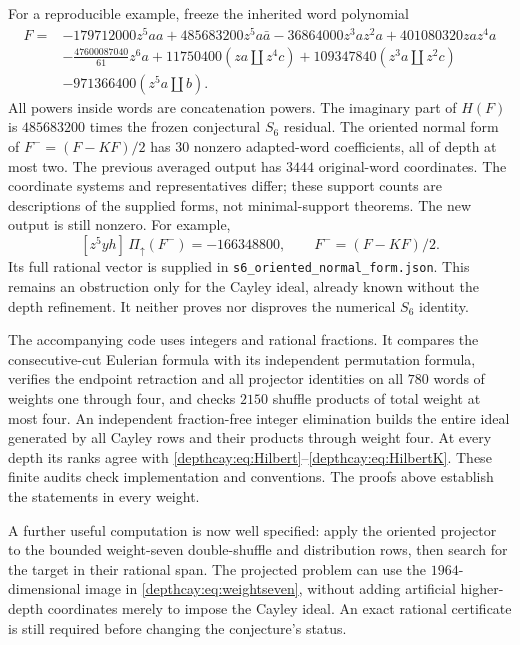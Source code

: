 \documentclass[11pt,a4paper]{article}
\numberwithin{equation}{section}
\theoremstyle{definition}
\theoremstyle{remark}
\newcommand{\shuffle}{\mathbin{\amalg}}
\begin{document}
For a reproducible example, freeze the inherited word polynomial
\cite[Eq.~\texttt{cay:eq:target}]{depth:PriorProjection}
\begin{align*}
F={}&-179712000z^5aa+485683200z^5a\bar a
       -36864000z^3az^2a+401080320zaz^4a\\
 &-\frac{47600087040}{61}z^6a
       +11750400(za\shuffle z^4c)
       +109347840(z^3a\shuffle z^2c)\\
 &-971366400(z^5a\shuffle b).
\end{align*}
All powers inside words are concatenation powers. The imaginary part
of $H(F)$ is $485683200$ times the frozen conjectural $S_6$ residual.
The oriented normal form of $F^-=(F-KF)/2$ has $30$ nonzero
adapted-word coefficients, all
of depth at most two. The previous averaged output has $3444$ original-word
coordinates. The coordinate systems and representatives differ; these
support counts are descriptions of the supplied forms, not minimal-support
theorems. The new output is still nonzero. For example,
\[
 [z^5yh]\,\Pi_{\uparrow}(F^-)= -166348800,
 \qquad F^-=(F-KF)/2.
\]
Its full rational vector is supplied in
\texttt{s6\_oriented\_normal\_form.json}. This remains an obstruction
only for the Cayley ideal, already known without the depth refinement.
It neither proves nor disproves the numerical $S_6$ identity.

The accompanying code uses integers and rational fractions. It compares
the consecutive-cut Eulerian formula with its independent permutation
formula, verifies the endpoint retraction and all projector identities
on all $780$ words of weights one through four, and checks $2150$
shuffle products of total weight at most four. An independent
fraction-free integer elimination builds the entire ideal generated by
all Cayley rows and their products through weight four. At every depth
its ranks agree with \eqref{depthcay:eq:Hilbert}--\eqref{depthcay:eq:HilbertK}.
These finite audits check implementation and conventions. The proofs
above establish the statements in every weight.

A further useful computation is now well specified: apply the oriented
projector to the bounded weight-seven double-shuffle and distribution
rows, then search for the target in their rational span. The projected
problem can use the $1964$-dimensional image in
\eqref{depthcay:eq:weightseven}, without adding artificial higher-depth
coordinates merely to impose the Cayley ideal. An exact rational
certificate is still required before changing the conjecture's status.
\end{document}
